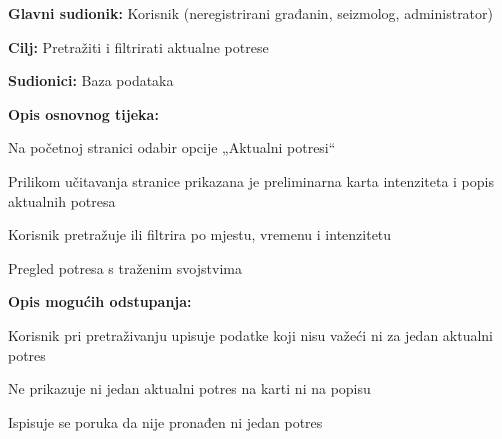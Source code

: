 			\begin{packed_item}
				
				\item \textbf{Glavni sudionik:} Korisnik (neregistrirani građanin, seizmolog, administrator)
				\item \textbf{Cilj:} Pretražiti i filtrirati aktualne potrese
				\item \textbf{Sudionici:} Baza podataka
				
				\item \textbf{Opis osnovnog tijeka:}
				
				\item[] \begin{packed_enum}
					\item Na početnoj stranici odabir opcije „Aktualni potresi“
					\item Prilikom učitavanja stranice prikazana je preliminarna karta intenziteta i popis aktualnih potresa
					\item Korisnik pretražuje ili filtrira po mjestu, vremenu i intenzitetu
					\item Pregled potresa s traženim svojstvima
				\end{packed_enum}
				
				\item  \textbf{Opis mogućih odstupanja:}
				
				\item[] \begin{packed_item}
					
					\item[3.a] Korisnik pri pretraživanju upisuje podatke koji nisu važeći ni za jedan aktualni potres
					\item[] \begin{packed_enum}
						
						\item Ne prikazuje ni jedan aktualni potres na karti ni na popisu
						\item Ispisuje se poruka da nije pronađen ni jedan potres
						
					\end{packed_enum}
					
				\end{packed_item}
				
			\end{packed_item}	
			
